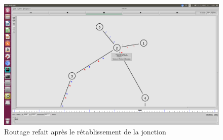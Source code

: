     \begin{figure}
    \centering
    \includegraphics[width=0.99\columnwidth]{./tp2/tp2-1-DV-5-relink_triggered.png}
    \caption{Routage refait après le rétablissement de la jonction}
    \end{figure}

